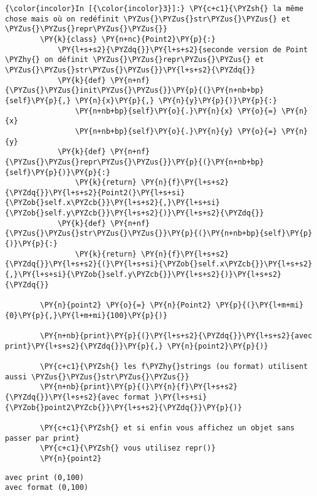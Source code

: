     \begin{Verbatim}[commandchars=\\\{\},frame=single,framerule=0.3mm,rulecolor=\color{cellframecolor}]
{\color{incolor}In [{\color{incolor}3}]:} \PY{c+c1}{\PYZsh{} la même chose mais où on redéfinit \PYZus{}\PYZus{}str\PYZus{}\PYZus{} et \PYZus{}\PYZus{}repr\PYZus{}\PYZus{}}
        \PY{k}{class} \PY{n+nc}{Point2}\PY{p}{:}
            \PY{l+s+s2}{\PYZdq{}}\PY{l+s+s2}{seconde version de Point \PYZhy{} on définit \PYZus{}\PYZus{}repr\PYZus{}\PYZus{} et \PYZus{}\PYZus{}str\PYZus{}\PYZus{}}\PY{l+s+s2}{\PYZdq{}}
            \PY{k}{def} \PY{n+nf}{\PYZus{}\PYZus{}init\PYZus{}\PYZus{}}\PY{p}{(}\PY{n+nb+bp}{self}\PY{p}{,} \PY{n}{x}\PY{p}{,} \PY{n}{y}\PY{p}{)}\PY{p}{:}
                \PY{n+nb+bp}{self}\PY{o}{.}\PY{n}{x} \PY{o}{=} \PY{n}{x}
                \PY{n+nb+bp}{self}\PY{o}{.}\PY{n}{y} \PY{o}{=} \PY{n}{y}
            \PY{k}{def} \PY{n+nf}{\PYZus{}\PYZus{}repr\PYZus{}\PYZus{}}\PY{p}{(}\PY{n+nb+bp}{self}\PY{p}{)}\PY{p}{:}
                \PY{k}{return} \PY{n}{f}\PY{l+s+s2}{\PYZdq{}}\PY{l+s+s2}{Point2(}\PY{l+s+si}{\PYZob{}self.x\PYZcb{}}\PY{l+s+s2}{,}\PY{l+s+si}{\PYZob{}self.y\PYZcb{}}\PY{l+s+s2}{)}\PY{l+s+s2}{\PYZdq{}}
            \PY{k}{def} \PY{n+nf}{\PYZus{}\PYZus{}str\PYZus{}\PYZus{}}\PY{p}{(}\PY{n+nb+bp}{self}\PY{p}{)}\PY{p}{:}
                \PY{k}{return} \PY{n}{f}\PY{l+s+s2}{\PYZdq{}}\PY{l+s+s2}{(}\PY{l+s+si}{\PYZob{}self.x\PYZcb{}}\PY{l+s+s2}{,}\PY{l+s+si}{\PYZob{}self.y\PYZcb{}}\PY{l+s+s2}{)}\PY{l+s+s2}{\PYZdq{}}
            
        \PY{n}{point2} \PY{o}{=} \PY{n}{Point2} \PY{p}{(}\PY{l+m+mi}{0}\PY{p}{,}\PY{l+m+mi}{100}\PY{p}{)}
        
        \PY{n+nb}{print}\PY{p}{(}\PY{l+s+s2}{\PYZdq{}}\PY{l+s+s2}{avec print}\PY{l+s+s2}{\PYZdq{}}\PY{p}{,} \PY{n}{point2}\PY{p}{)}
        
        \PY{c+c1}{\PYZsh{} les f\PYZhy{}strings (ou format) utilisent aussi \PYZus{}\PYZus{}str\PYZus{}\PYZus{}}
        \PY{n+nb}{print}\PY{p}{(}\PY{n}{f}\PY{l+s+s2}{\PYZdq{}}\PY{l+s+s2}{avec format }\PY{l+s+si}{\PYZob{}point2\PYZcb{}}\PY{l+s+s2}{\PYZdq{}}\PY{p}{)}
        
        \PY{c+c1}{\PYZsh{} et si enfin vous affichez un objet sans passer par print}
        \PY{c+c1}{\PYZsh{} vous utilisez repr()}
        \PY{n}{point2}
\end{Verbatim}


    \begin{Verbatim}[commandchars=\\\{\},frame=single,framerule=0.3mm,rulecolor=\color{cellframecolor}]
avec print (0,100)
avec format (0,100)
\end{Verbatim}


